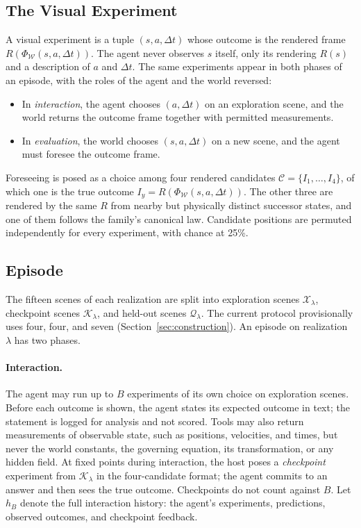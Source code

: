 \subsection{The Visual Experiment}

A visual experiment is a tuple $(s,a,\Delta t)$ whose outcome is the rendered frame $R(\Phi_{\mathcal{W}}(s,a,\Delta t))$. The agent never observes $s$ itself, only its rendering $R(s)$ and a description of $a$ and $\Delta t$. The same experiments appear in both phases of an episode, with the roles of the agent and the world reversed:
\begin{itemize}
  \item In \emph{interaction}, the agent chooses $(a,\Delta t)$ on an exploration scene, and the world returns the outcome frame together with permitted measurements.
  \item In \emph{evaluation}, the world chooses $(s,a,\Delta t)$ on a new scene, and the agent must foresee the outcome frame.
\end{itemize}
Foreseeing is posed as a choice among four rendered candidates $\mathcal{C}=\{I_1,\dots,I_4\}$, of which one is the true outcome $I_y=R(\Phi_{\mathcal{W}}(s,a,\Delta t))$. The other three are rendered by the same $R$ from nearby but physically distinct successor states, and one of them follows the family's canonical law. Candidate positions are permuted independently for every experiment, with chance at 25\%. 

\subsection{Episode}

The fifteen scenes of each realization are split into exploration scenes $\mathcal{X}_\lambda$, checkpoint scenes $\mathcal{K}_\lambda$, and held-out scenes $\mathcal{Q}_\lambda$. The current protocol provisionally uses four, four, and seven (Section~\ref{sec:construction}). An episode on realization $\lambda$ has two phases.

\paragraph{Interaction.} The agent may run up to $B$ experiments of its own choice on exploration scenes. Before each outcome is shown, the agent states its expected outcome in text; the statement is logged for analysis and not scored. Tools may also return measurements of observable state, such as positions, velocities, and times, but never the world constants, the governing equation, its transformation, or any hidden field. At fixed points during interaction, the host poses a \emph{checkpoint} experiment from $\mathcal{K}_\lambda$ in the four-candidate format; the agent commits to an answer and then sees the true outcome. Checkpoints do not count against $B$. Let $h_B$ denote the full interaction history: the agent's experiments, predictions, observed outcomes, and checkpoint feedback.

